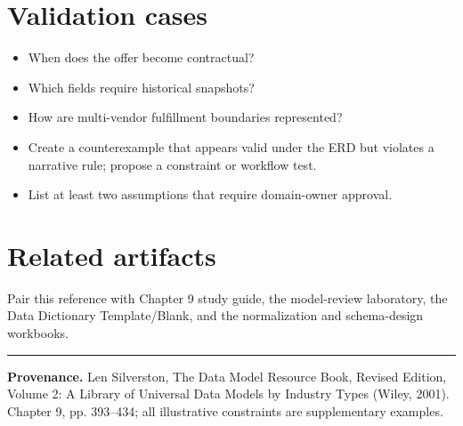\documentclass[11pt,letterpaper]{article}
\begin{document}
\section{Validation cases}
\begin{itemize}
\item When does the offer become contractual?
\item Which fields require historical snapshots?
\item How are multi-vendor fulfillment boundaries represented?
\item Create a counterexample that appears valid under the ERD but violates a narrative rule; propose a constraint or workflow test.
\item List at least two assumptions that require domain-owner approval.
\end{itemize}

\section{Related artifacts}
Pair this reference with Chapter 9 study guide, the model-review laboratory, the Data Dictionary Template/Blank, and the normalization and schema-design workbooks.


\vfill
\hrule
{\footnotesize\textbf{Provenance.} Len Silverston, The Data Model Resource Book, Revised Edition, Volume 2: A Library of Universal Data Models by Industry Types (Wiley, 2001). Chapter 9, pp. 393--434; all illustrative constraints are supplementary examples.}
\end{document}
